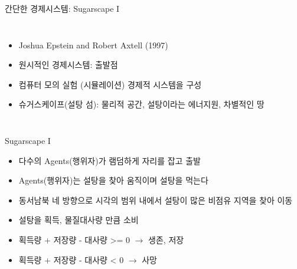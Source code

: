 \documentclass[final]{beamer}
\begin{document}
\begin{frame}[t]{간단한 경제시스템: Sugarscape I}
	\begin{columns}[c]
	\column{16em}
	\begin{itemize}
		\item Joshua Epstein and Robert Axtell (1997)
		\item 원시적인 경제시스템: 출발점
		\item 컴퓨터 모의 실험 (시뮬레이션) 경제적 시스템을 구성
		\item 슈거스케이프(설탕 섬): 물리적 공간, 설탕이라는 에너지원, 차별적인 땅
	\end{itemize}
	\column{12em}
	\end{columns}
\end{frame}

\begin{frame}[t]{Sugarscape I}
	\begin{itemize}
		\item 다수의 Agents(행위자)가 램덤하게 자리를 잡고 출발
		\item Agents(행위자)는 설탕을 찾아 움직이며 설탕을 먹는다
		\item 동서남북 네 방향으로 시각의 범위 내에서 설탕이 많은 비점유 지역을 찾아 이동
		\item 설탕을 획득, 물질대사량 만큼 소비
		\item 획득량 + 저장량 - 대사량 >= 0 $\rightarrow$ 생존, 저장 
		\item 획득량 + 저장량 - 대사량 < 0 $\rightarrow$ 사망 
	\end{itemize}
\end{frame}
\end{document}
